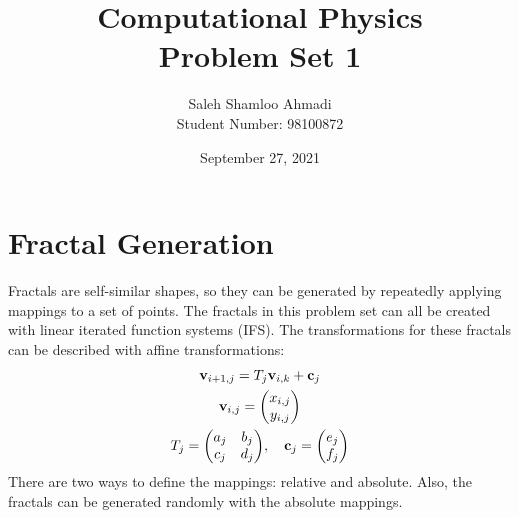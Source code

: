 \documentclass[12pt,a4paper]{article}
\title{Computational Physics\\Problem Set 1}
\author{Saleh Shamloo Ahmadi\\Student Number: 98100872}
\date{September 27, 2021}
\begin{document}
	\maketitle
    \section{Fractal Generation}
    Fractals are self-similar shapes, so they can be generated by repeatedly applying mappings to a set of points.
    The fractals in this problem set can all be created with linear iterated function systems (IFS).
    The transformations for these fractals can be described with affine transformations:
    \begin{gather}
        \vb{v}_{i+1, j} = T_j\vb{v}_{i, k} + \vb{c}_j\\
        \vb{v}_{i, j} = \mqty(x_{i,j} \\ y_{i,j}) \\
        T_j = \mqty(a_j & b_j \\ c_j & d_j),\quad \vb{c}_j = \mqty(e_j \\ f_j)
    \end{gather}
    There are two ways to define the mappings: relative and absolute. Also, the fractals can be generated randomly
    with the absolute mappings.
\end{document}
